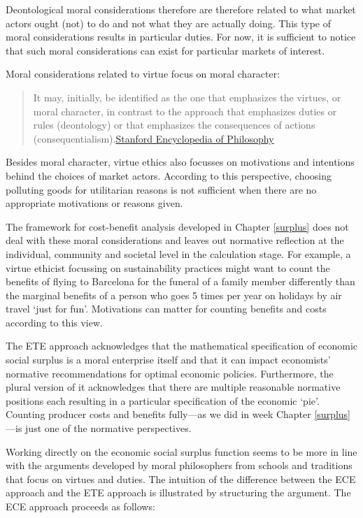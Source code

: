 \documentclass[
]{book}
\begin{document}
Deontological moral considerations therefore are therefore related to what market actors ought (not) to do and not what they are actually doing. This type of moral considerations results in particular duties. For now, it is sufficient to notice that such moral considerations can exist for particular markets of interest.

Moral considerations related to virtue focus on moral character:

\begin{quote}
It may, initially, be identified as the one that emphasizes the virtues, or moral character, in contrast to the approach that emphasizes duties or rules (deontology) or that emphasizes the consequences of actions (consequentialism).\href{https://plato.stanford.edu/entries/ethics-deontological/}{Stanford Encyclopedia of Philosophy}
\end{quote}

Besides moral character, virtue ethics also focusses on motivations and intentions behind the choices of market actors. According to this perspective, choosing polluting goods for utilitarian reasons is not sufficient when there are no appropriate motivations or reasons given.

The framework for cost-benefit analysis developed in Chapter \ref{surplus} does not deal with these moral considerations and leaves out normative reflection at the individual, community and societal level in the calculation stage. For example, a virtue ethicist focussing on sustainability practices might want to count the benefits of flying to Barcelona for the funeral of a family member differently than the marginal benefits of a person who goes 5 times per year on holidays by air travel `just for fun'. Motivations can matter for counting benefits and costs according to this view.

The ETE approach acknowledges that the mathematical specification of economic social surplus is a moral enterprise itself and that it can impact economists' normative recommendations for optimal economic policies. Furthermore, the plural version of it acknowledges that there are multiple reasonable normative positions each resulting in a particular specification of the economic `pie'. Counting producer costs and benefits fully---as we did in week Chapter \ref{surplus}---is just one of the normative perspectives.

Working directly on the economic social surplus function seems to be more in line with the arguments developed by moral philosophers from schools and traditions that focus on virtues and duties. The intuition of the difference between the ECE approach and the ETE approach is illustrated by structuring the argument. The ECE approach proceeds as follows:
\end{document}
